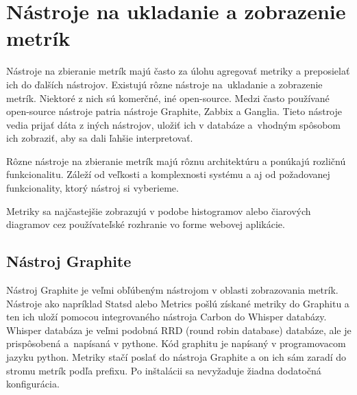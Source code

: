\documentclass[a4paper, upjsfrontpage, disablespecwarning, thesismargins, thesislinespacing]{rnthesis}
\begin{document}
\newpage


\chapter{Nástroje na ukladanie a zobrazenie metrík}

Nástroje na zbieranie metrík majú často za úlohu agregovať metriky a preposielať ich do ďalších nástrojov.
Existujú rôzne nástroje na~ukladanie a zobrazenie metrík.
Niektoré z nich sú komerčné, iné open-source.
Medzi často používané open-source nástroje patria nástroje Graphite, Zabbix a Ganglia.
Tieto nástroje vedia prijať dáta z iných nástrojov, uložiť ich v databáze a~vhodným spôsobom ich zobraziť, aby sa dali ľahšie interpretovať.

Rôzne nástroje na zbieranie metrík majú rôznu architektúru a ponúkajú rozličnú funkcionalitu.
Záleží od veľkosti a komplexnosti systému a aj od požadovanej funkcionality, ktorý nástroj si vyberieme.

Metriky sa najčastejšie zobrazujú v podobe histogramov alebo čiarových diagramov cez používateľské rozhranie vo forme webovej aplikácie.


\section{Nástroj Graphite}

Nástroj Graphite je veľmi obľúbeným nástrojom v oblasti zobrazovania metrík.
Nástroje ako napríklad Statsd alebo Metrics pošlú získané metriky do Graphitu a ten ich uloží pomocou integrovaného nástroja Carbon do Whisper databázy. 
Whisper databáza je veľmi podobná RRD (round robin database) databáze, ale je prispôsobená a~napísaná v pythone.
Kód graphitu je napísaný v programovacom jazyku python.
Metriky stačí poslať do nástroja Graphite a on ich sám zaradí do stromu metrík podľa prefixu.
Po inštalácii sa nevyžaduje žiadna dodatočná konfigurácia.
\end{document}
